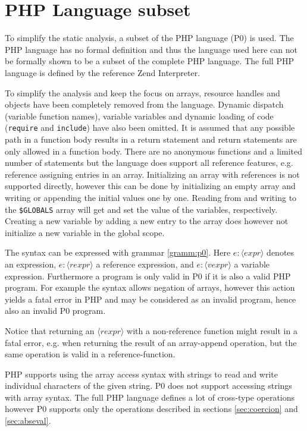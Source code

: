 \section{PHP Language subset}
\newcommand{\syn}[1]{\langle\mathit{#1}\rangle}
\label{sec:langsubset}
To simplify the static analysis, a subset of the PHP language (P0) is used. The PHP language has no formal definition and thus the language used here can not be formally shown to be a subset of the complete PHP language. The full PHP language is defined by the reference Zend Interpreter.

To simplify the analysis and keep the focus on arrays, resource handles and objects have been completely removed from the language. Dynamic dispatch (variable function names), variable variables and dynamic loading of code (\texttt{require} and \texttt{include}) have also been omitted. It is assumed that any possible path in a function body results in a return statement and return statements are only allowed in a function body. There are no anonymous functions and a limited number of statements but the language does support all reference features, e.g. reference assigning entries in an array. Initializing an array with references is not supported directly, however this can be done by initializing an empty array and writing or appending the initial values one by one. Reading from and writing to the \texttt{\$GLOBALS} array will get and set the value of the variables, respectively. Creating a new variable by adding a new entry to the array does however not initialize a new variable in the global scope.

The syntax can be expressed with grammar \ref{gramm:p0}. Here $e : \syn{expr}$ denotes an expression, $e : \syn{rexpr}$ a reference expression, and $e : \syn{vexpr}$ a variable expression.   Furthermore a program is only valid in P0 if it is also a valid PHP program. For example the syntax allows negation of arrays, however this action yields a fatal error in PHP and may be considered as an invalid program, hence also an invalid P0 program. 

Notice that returning an $\syn{rexpr}$ with a non-reference function might result in a fatal error, e.g. when returning the result of an array-append operation, but the same operation is valid in a reference-function.

PHP supports using the array access syntax with strings to read and write individual characters of the given string. P0 does not support accessing strings with array syntax. The full PHP language defines a lot of cross-type operations however P0 supports only the operations described in sections \ref{sec:coercion} and \ref{sec:abseval}.

